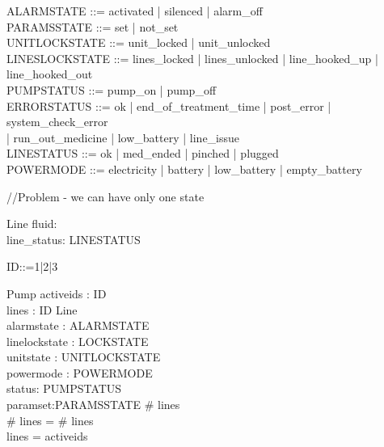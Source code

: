 \documentclass{article}
\begin{document}
	
	\begin{zed}		
		ALARMSTATE ::= activated | silenced | alarm\_off \\
		
		PARAMSSTATE ::= set | not\_set \\
		
		UNITLOCKSTATE ::= unit\_locked | unit\_unlocked \\
		
		LINESLOCKSTATE ::= lines\_locked | lines\_unlocked | line\_hooked\_up | line\_hooked\_out \\
		
		PUMPSTATUS ::= pump\_on | pump\_off \\		
		
		ERRORSTATUS ::= ok | end\_of\_treatment\_time | post\_error | system\_check\_error \\ | run\_out\_medicine | low\_battery | line\_issue \\
		
		LINESTATUS ::= ok | med\_ended | pinched | plugged \\
		
		POWERMODE ::= electricity | battery | low\_battery | empty\_battery \\
	\end{zed}
	
	//Problem - we can have only one state
	
	\begin{schema}{Line}
		fluid: \nat \\
		line\_status: LINESTATUS	
	\end{schema}
	
	\begin{zed}
		ID::=1|2|3
	\end{zed}
		
	\begin{schema}{Pump}
		activeids : \power ID\\
		lines : ID \pfun Line \\
		alarmstate : ALARMSTATE \\
		linelockstate : LOCKSTATE \\
		unitstate : UNITLOCKSTATE \\
		powermode : POWERMODE \\
		status: PUMPSTATUS\\
		paramset:PARAMSSTATE
	\where
		\# \ran lines \\
		\# \ran lines = \# \dom lines\\
		\dom lines = activeids\\
	\end{schema}
	
\end{document}
